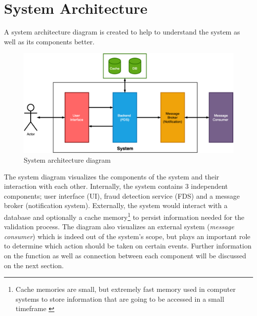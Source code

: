 \section{System Architecture}

A system architecture diagram is created to help to understand the system as well as its components better. 

\begin{figure}[h]
 \includegraphics[width=\textwidth]{diagrams/system.png}
 \caption{System architecture diagram}
\end{figure}
 
The system diagram visualizes the components of the system and their interaction with each other. Internally, the system contains 3 independent components; user interface (UI), fraud detection service (FDS) and a message broker (notification system). 
Externally, the system would interact with a database and optionally a cache memory\footnote{Cache memories are small, but extremely fast memory used in computer systems to store information that are going to be accessed in a small timeframe \autocite{smith-1982}}  to persist information needed for the validation process. The diagram also visualizes an external system (\emph{message consumer}) which is indeed out of the system's scope, but plays an important role to determine which action should be taken on certain events. Further information on the function as well as connection between each component will be discussed on the next section.